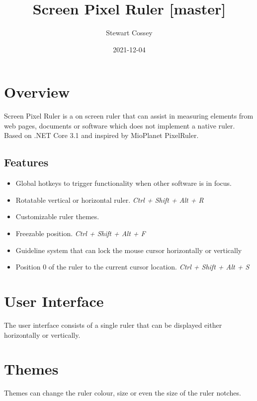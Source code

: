 \documentclass[
]{book}
\title{Screen Pixel Ruler {[}master{]}}
\author{Stewart Cossey}
\date{2021-12-04}
\providecommand{\tightlist}{%
  \setlength{\itemsep}{0pt}\setlength{\parskip}{0pt}}
\begin{document}
\maketitle

{
\setcounter{tocdepth}{1}
\tableofcontents
}
\hypertarget{overview}{%
\chapter{Overview}\label{overview}}

Screen Pixel Ruler is a on screen ruler that can assist in measuring elements from web pages, documents or software which does not implement a native ruler.
Based on .NET Core 3.1 and inspired by MioPlanet PixelRuler.

\hypertarget{features}{%
\section{Features}\label{features}}

\begin{itemize}
\tightlist
\item
  Global hotkeys to trigger functionality when other software is in focus.
\item
  Rotatable vertical or horizontal ruler. \emph{Ctrl + Shift + Alt + R}
\item
  Customizable ruler themes.
\item
  Freezable position. \emph{Ctrl + Shift + Alt + F}
\item
  Guideline system that can lock the mouse cursor horizontally or vertically
\item
  Position 0 of the ruler to the current cursor location. \emph{Ctrl + Shift + Alt + S}
\end{itemize}

\hypertarget{ui}{%
\chapter{User Interface}\label{ui}}

The user interface consists of a single ruler that can be displayed either horizontally or vertically.

\hypertarget{themes}{%
\chapter{Themes}\label{themes}}

Themes can change the ruler colour, size or even the size of the ruler notches.
\end{document}
